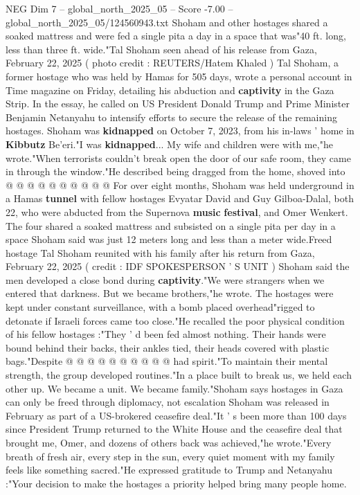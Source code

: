 \begin{textsample}{NEG Dim 7 – global\_north\_2025\_05 – Score -7.00 – global\_north\_2025\_05/124560943.txt}  \label{ex:f7_neg_109}
Shoham and other hostages shared a soaked mattress and were fed a single pita a day in a space that was"40 ft. long, less than three ft. wide."Tal Shoham seen ahead of his release from Gaza, February 22, 2025 ( photo credit : REUTERS/Hatem Khaled ) Tal Shoham, a former hostage who was held by Hamas for 505 days, wrote a personal account in Time magazine on Friday, detailing his abduction and \textbf{captivity} in the Gaza Strip.
In the essay, he called on US President Donald Trump and Prime Minister Benjamin Netanyahu to intensify efforts to secure the release of the remaining hostages.
Shoham was \textbf{kidnapped} on October 7, 2023, from his in-laws ' home in \textbf{Kibbutz} Be'eri."I was \textbf{kidnapped}...
My wife and children were with me,"he wrote."When terrorists couldn't break open the door of our safe room, they came in through the window."He described being dragged from the home, shoved into @ @ @ @ @ @ @ @ @ @ For over eight months, Shoham was held underground in a Hamas \textbf{tunnel} with fellow hostages Evyatar David and Guy Gilboa-Dalal, both 22, who were abducted from the Supernova \textbf{music} \textbf{festival}, and Omer Wenkert.
The four shared a soaked mattress and subsisted on a single pita per day in a space Shoham said was just 12 meters long and less than a meter wide.Freed hostage Tal Shoham reunited with his family after his return from Gaza, February 22, 2025 ( credit : IDF SPOKESPERSON ' S UNIT ) Shoham said the men developed a close bond during \textbf{captivity}."We were strangers when we entered that darkness.
But we became brothers,"he wrote.
The hostages were kept under constant surveillance, with a bomb placed overhead"rigged to detonate if Israeli forces came too close."He recalled the poor physical condition of his fellow hostages :"They ' d been fed almost nothing.
Their hands were bound behind their backs, their ankles tied, their heads covered with plastic bags."Despite @ @ @ @ @ @ @ @ @ @ had spirit."To maintain their mental strength, the group developed routines."In a place built to break us, we held each other up.
We became a unit.
We became family."Shoham says hostages in Gaza can only be freed through diplomacy, not escalation Shoham was released in February as part of a US-brokered ceasefire deal."It ' s been more than 100 days since President Trump returned to the White House and the ceasefire deal that brought me, Omer, and dozens of others back was achieved,"he wrote."Every breath of fresh air, every step in the sun, every quiet moment with my family feels like something sacred."He expressed gratitude to Trump and Netanyahu :"Your decision to make the hostages a priority helped bring many people home.

\end{textsample}
